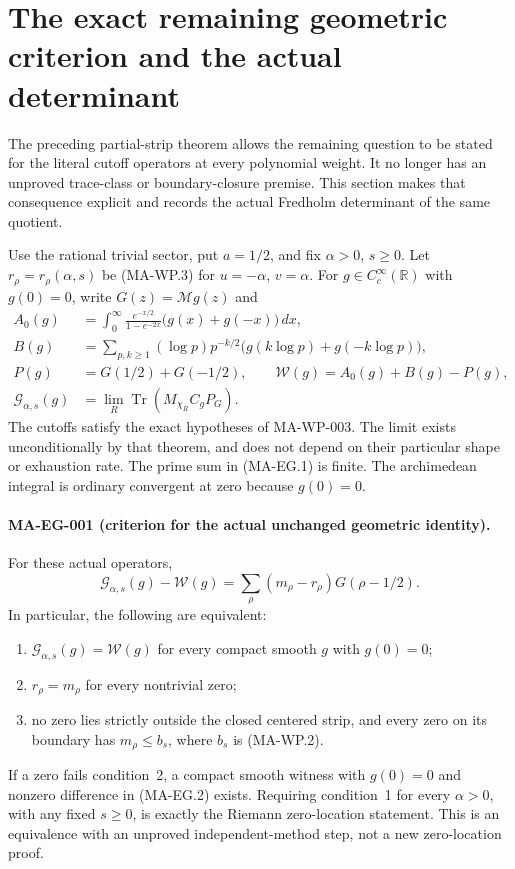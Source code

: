\section{The exact remaining geometric criterion and the actual determinant}
\label{sec:exact-geometric-gate}

The preceding partial-strip theorem allows the remaining question to
be stated for the literal cutoff operators at every polynomial weight.
It no longer has an unproved trace-class or boundary-closure premise.
This section makes that consequence explicit and records the actual
Fredholm determinant of the same quotient.

Use the rational trivial sector, put $a=1/2$, and fix
$\alpha>0$, $s\ge0$. Let $r_\rho=r_\rho(\alpha,s)$ be
(MA-WP.3) for $u=-\alpha$, $v=\alpha$.
For $g\in C_c^\infty(\mathbb R)$ with $g(0)=0$, write
$G(z)=\mathcal Mg(z)$ and
\[
\begin{aligned}
 A_0(g)&=\int_0^\infty
   \frac{e^{-x/2}}{1-e^{-2x}}\bigl(g(x)+g(-x)\bigr)\,dx,\\
 B(g)&=\sum_{p,k\ge1}(\log p)p^{-k/2}
                 \bigl(g(k\log p)+g(-k\log p)\bigr),\\
 P(g)&=G(1/2)+G(-1/2),\qquad
 \mathcal W(g)=A_0(g)+B(g)-P(g),\\
 \mathcal G_{\alpha,s}(g)&=
      \lim_R\operatorname{Tr}(M_{\chi_R}C_gP_G).
\end{aligned}
\tag{MA-EG.1}
\]
The cutoffs satisfy the exact hypotheses of MA-WP-003.
The limit exists unconditionally by that theorem, and does not
depend on their particular shape or exhaustion rate.
The prime sum in (MA-EG.1) is finite. The archimedean integral
is ordinary convergent at zero because $g(0)=0$.

\paragraph{MA-EG-001 (criterion for the actual unchanged geometric identity).}
For these actual operators,
\[
 \mathcal G_{\alpha,s}(g)-\mathcal W(g)
    =\sum_\rho (m_\rho-r_\rho)G(\rho-1/2).
 \tag{MA-EG.2}
\]
In particular, the following are equivalent:
\begin{enumerate}
\item $\mathcal G_{\alpha,s}(g)=\mathcal W(g)$ for every compact
smooth $g$ with $g(0)=0$;
\item $r_\rho=m_\rho$ for every nontrivial zero;
\item no zero lies strictly outside the closed centered strip,
and every zero on its boundary has $m_\rho\le b_s$,
where $b_s$ is (MA-WP.2).
\end{enumerate}
If a zero fails condition~2, a compact smooth witness with
$g(0)=0$ and nonzero difference in (MA-EG.2) exists.
Requiring condition~1 for every $\alpha>0$, with any fixed
$s\ge0$, is exactly the Riemann zero-location statement.
This is an equivalence with an unproved independent-method step,
not a new zero-location proof.

